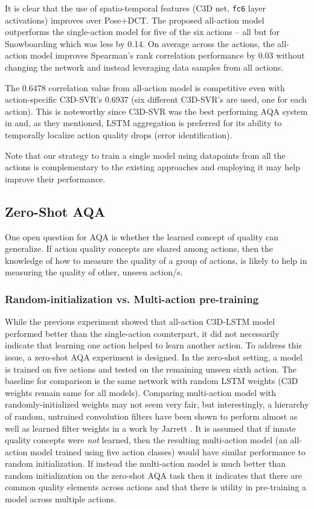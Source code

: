\documentclass[10pt,twocolumn,letterpaper]{article}
\begin{document}
It is clear that the use of spatio-temporal features (C3D net, \texttt{fc6} layer activations) improves over Pose+DCT. The proposed all-action model outperforms the single-action model for five of the six actions -- all but for Snowboarding which was less by 0.14.  On average across the actions, the all-action model improves Spearman's rank correlation performance by 0.03 without changing the network and instead leveraging data samples from all actions.  

The 0.6478 correlation value from all-action model is competitive even with action-specific C3D-SVR's 0.6937 (six different C3D-SVR's are used, one for each action).  This is noteworthy since C3D-SVR was the best performing AQA system in \cite{parmar} and, as they mentioned, LSTM aggregation is preferred for its ability to temporally localize action quality drops (error identification). 

Note that our strategy to train a single model using datapoints from all the actions is complementary to the existing approaches and employing it may help improve their performance.
\subsection{Zero-Shot AQA}
\label{exp_2}
One open question for AQA is whether the learned concept of quality can generalize. If action quality concepts are shared among actions, then the knowledge of how to measure the quality of a group of actions, is likely to help in measuring the quality of other, unseen action/s.
\subsubsection{Random-initialization vs. Multi-action pre-training}
While the previous experiment showed that all-action C3D-LSTM model performed better than the single-action counterpart, it did not necessarily indicate that learning one action helped to learn another action.  To address this issue, a zero-shot AQA experiment is designed.  In the zero-shot setting, a model is trained on five actions and tested on the remaining unseen sixth action.  The baseline for comparison is the same network with random LSTM weights (C3D weights remain same for all models). Comparing multi-action model with randomly-initialized weights may not seem very fair, but interestingly, a hierarchy of random, untrained convolution filters have been shown to perform almost as well as learned filter weights in a work by Jarrett \etal \cite{jarrett}. It is assumed that if innate quality concepts were \textit{not} learned, then the resulting multi-action model (an all-action model trained using five action classes) would have similar performance to random initialization.  If instead the multi-action model is much better than random initialization on the zero-shot AQA task then it indicates that there are common quality elements across actions and that there is utility in pre-training a model across multiple actions.
\end{document}
